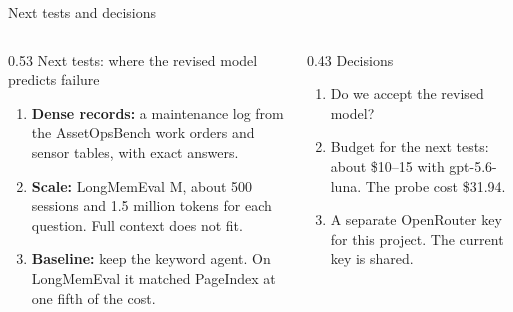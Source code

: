\documentclass[aspectratio=169,11pt]{beamer}
\newcommand{\lbl}[1]{{\color{Mute}\fontsize{9.5}{12}\selectfont #1}\par}
\begin{document}
\begin{frame}{Next tests and decisions}
  \vspace{0.20cm}
  \begin{columns}[T,onlytextwidth]
    \begin{column}{0.53\textwidth}
      \lbl{Next tests: where the revised model predicts failure}
      \vspace{0.06cm}
      {\fontsize{10}{13}\selectfont
      \begin{enumerate}\setlength{\itemsep}{3pt}
        \item \textbf{Dense records:} a maintenance log from the AssetOpsBench work orders and sensor tables, with exact answers.
        \item \textbf{Scale:} LongMemEval M, about 500 sessions and 1.5 million tokens for each question. Full context does not fit.
        \item \textbf{Baseline:} keep the keyword agent. On LongMemEval it matched PageIndex at one fifth of the cost.
      \end{enumerate}}
    \end{column}
    \begin{column}{0.43\textwidth}
      \lbl{Decisions}
      \vspace{0.06cm}
      {\fontsize{10}{13}\selectfont
      \begin{enumerate}\setlength{\itemsep}{3pt}
        \item Do we accept the revised model?
        \item Budget for the next tests: about \$10--15 with gpt-5.6-luna. The probe cost \$31.94.
        \item A separate OpenRouter key for this project. The current key is shared.
      \end{enumerate}}
    \end{column}
  \end{columns}
\end{frame}
\end{document}

